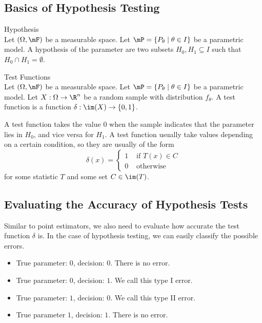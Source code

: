 \documentclass[a4paper]{article}
\begin{document}
\subsection{Basics of Hypothesis Testing}
\begin{defn}{Hypothesis}{}\\
Let $(\Omega,\mF)$ be a measurable space. Let $\mP=\{P_\theta\;|\;\theta\in I\}$ be a parametric model. A hypothesis of the parameter are two subsets $H_0,H_1\subseteq I$ such that $H_0\cap H_1=\emptyset$. 
\end{defn}

\begin{defn}{Test Functions}{}\\
Let $(\Omega,\mF)$ be a measurable space. Let $\mP=\{P_\theta\;|\;\theta\in I\}$ be a parametric model. Let $X:\Omega\to\R^n$ be a random sample with distribution $f_\theta$. A test function is a function $\delta:\im(X)\to\{0,1\}$. 
\end{defn}

A test function takes the value $0$ when the sample indicates that the parameter lies in $H_0$, and vice versa for $H_1$. A test function usually take values depending on a certain condition, so they are usually of the form $$\delta(x)=\begin{cases}
1 & \text{ if } T(x)\in C\\
0 & \text{ otherwise }
\end{cases}$$ for some statistic $T$ and some set $C\in\im(T)$. \\

\subsection{Evaluating the Accuracy of Hypothesis Tests}
Similar to point estimators, we also need to evaluate how accurate the test function $\delta$ is. In the case of hypothesis testing, we can easily classify the possible errors. 
\begin{itemize}
\item True parameter: $0$, decision: $0$. There is no error. 
\item True parameter: $0$, decision: $1$. We call this type I error. 
\item True parameter: $1$, decision: $0$. We call this type II error. 
\item True parameter $1$, decision: $1$. There is no error. 
\end{itemize}
\end{document}
